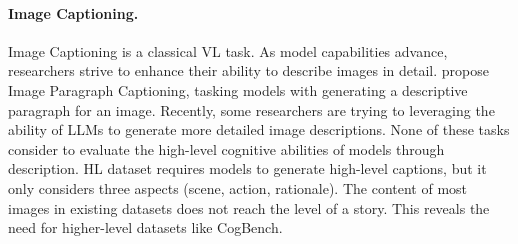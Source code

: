 \paragraph{Image Captioning.}
Image Captioning is a classical VL task. 
As model capabilities advance, researchers strive to enhance their ability to describe images in detail.
\citet{krause2017hierarchical} propose Image Paragraph Captioning, tasking models with generating a descriptive paragraph for an image.
Recently, some researchers \cite{xie2022visual, zhu2023chatgpt, zhuge2023mindstorms,chen2023sharegpt4v} are trying to leveraging the ability of LLMs to generate more detailed image descriptions.
None of these tasks consider to evaluate the high-level cognitive abilities of models through description.
HL dataset \cite{cafagna2023hl} requires models to generate high-level captions, but it only considers three aspects (scene, action, rationale).
The content of most images in existing datasets does not reach the level of a story.
This reveals the need for higher-level datasets like CogBench.


